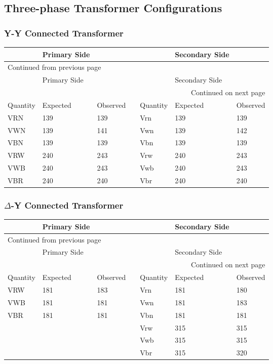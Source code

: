 \documentclass[11pt]{article}
\begin{document}
\subsection{Three-phase Transformer Configurations}
\label{sec:orgb145231}
\subsubsection{Y-Y Connected Transformer}
\label{sec:org775a045}
\begin{longtable}{|l|l|l|l|l|l|l|}
\hline
 & Primary Side &  &  &  & Secondary Side & \\
\hline
\endfirsthead
\multicolumn{7}{l}{Continued from previous page} \\
\hline

 & Primary Side &  &  &  & Secondary Side &  \\

\hline
\endhead
\hline\multicolumn{7}{r}{Continued on next page} \\
\endfoot
\endlastfoot
\hline
Quantity & Expected & Observed &  & Quantity & Expected & Observed\\
\hline
VRN & 139 & 139 &  & Vrn & 139 & 139\\
\hline
VWN & 139 & 141 &  & Vwn & 139 & 142\\
\hline
VBN & 139 & 139 &  & Vbn & 139 & 139\\
\hline
VRW & 240 & 243 &  & Vrw & 240 & 243\\
\hline
VWB & 240 & 243 &  & Vwb & 240 & 243\\
VBR & 240 & 240 &  & Vbr & 240 & 240\\
\hline
\end{longtable}
\subsubsection{\(\Delta\)-Y Connected Transformer}
\label{sec:orge9838e3}
\begin{longtable}{|l|l|l|l|l|l|l|}
\hline
 & Primary Side &  &  &  & Secondary Side & \\
\hline
\endfirsthead
\multicolumn{7}{l}{Continued from previous page} \\
\hline

 & Primary Side &  &  &  & Secondary Side &  \\

\hline
\endhead
\hline\multicolumn{7}{r}{Continued on next page} \\
\endfoot
\endlastfoot
\hline
Quantity & Expected & Observed &  & Quantity & Expected & Observed\\
\hline
VRW & 181 & 183 &  & Vrn & 181 & 180\\
\hline
VWB & 181 & 181 &  & Vwn & 181 & 183\\
\hline
VBR & 181 & 181 &  & Vbn & 181 & 181\\
\hline
 &  &  &  & Vrw & 315 & 315\\
\hline
 &  &  &  & Vwb & 315 & 315\\
\hline
 &  &  &  & Vbr & 315 & 320\\
\hline
\end{longtable}
\end{document}
